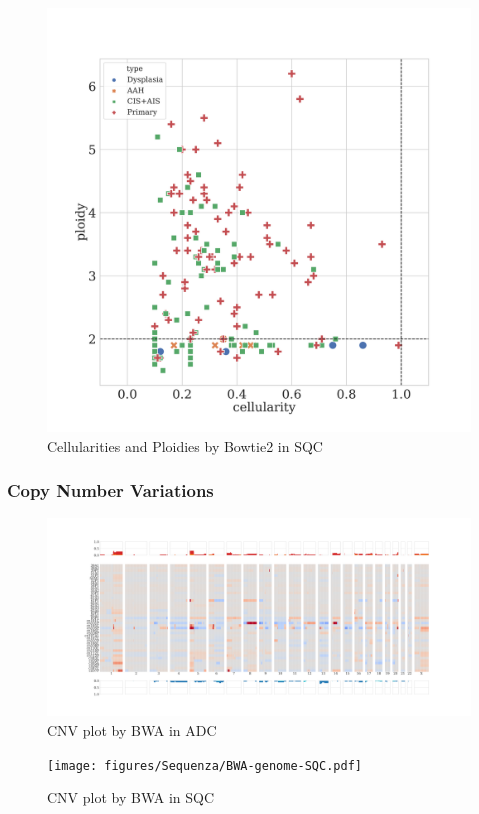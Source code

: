 \documentclass[a4paper]{article}
\begin{document}
                \begin{figure}[htbp]
                    \centering
                    \includegraphics[width=0.6 \linewidth]{figures/Sequenza/Bowtie2-sequenza-SQC.pdf}
                    \caption{Cellularities and Ploidies by Bowtie2 in SQC}
                    \label{fig:sequenza-Bowtie2-SQC}
                \end{figure}

            \subsubsection{Copy Number Variations}
                \begin{figure}[htbp]
                    \centering
                    \includegraphics[width=\linewidth]{figures/Sequenza/BWA-genome-ADC.pdf}
                    \caption{CNV plot by BWA in ADC}
                    \label{fig:CNV-BWA-ADC}
                \end{figure}

                \begin{figure}[htbp]
                    \centering
                    \texttt{[image: figures/Sequenza/BWA-genome-SQC.pdf]}
                    \caption{CNV plot by BWA in SQC}
                    \label{fig:CNV-BWA-SQC}
                \end{figure}
\end{document}
